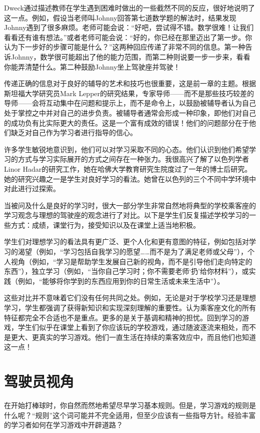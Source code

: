 Dweck通过描述教师在学生遇到困难时做出的一些截然不同的反应，很好地说明了这一点。例如，假设当老师叫Johnny回答第七道数学题的解法时，结果发现Johnny遇到了很多麻烦。老师可能会说：“好吧，尝试得不错。数学很难！让我们看看还有谁有想法。”或者老师可能会说：“好的，你已经在那里迈出了第一步。你认为下一步好的步骤可能是什么？”这两种回应传递了非常不同的信息。第一种告诉Johnny，数学很可能超出了他的能力范围，而第二种则说要一步一步来，看看你能弄清楚什么。第二种鼓励Johnny坐上驾驶座并驾驶！

传递正确的信息对于良好的辅导的艺术和技巧也很重要，这是前一章的主题。根据斯坦福大学研究员Mark Lepper的研究结果，专家导师——而不是那些技巧较差的导师——会将互动集中在问题和提示上，而不是命令上，以鼓励被辅导者认为自己处于掌控之中并对自己的进步负责。被辅导者通常会形成一种印象，即他们对自己的成功负有比实际更大的责任。这是一个富有成效的错误！他们的问题部分在于他们缺乏对自己作为学习者进行指导的信心。

许多学生敏锐地意识到，他们可以对学习采取不同的心态。他们认识到他们希望学习的方式与学习实际展开的方式之间存在一种张力。我很高兴了解了以色列学者Linor Hadar的研究工作，她在哈佛大学教育研究生院度过了一年的博士后研究。她的研究兴趣之一是学生对良好学习的看法。她曾在以色列的三个不同中学环境中对此进行过探索。

当被问及什么是良好的学习时，很大一部分学生非常自然地将典型的学校乘客座的学习观念与理想的驾驶座的观念进行了对比。以下是学生们反复描述学校学习的一些方式：成绩，课堂行为，接受知识以及在课堂上适当地积极。

学生们对理想学习的看法具有更广泛、更个人化和更有意图的特征，例如包括对学习的渴望（例如，“学习包括自我学习的愿望……而不是为了满足老师或父母”），个人视角（例如，“学习是帮助学生发展自己新的视角，而不是引导他们走向特定的东西”），独立学习（例如，“当你自己学习时；你不需要老师‘扔’给你材料”），或实践（例如，“能够将你学到的东西应用到你的日常生活或未来生活中”）。

这些对比并不意味着它们没有任何共同之处。例如，无论是对于学校学习还是理想学习，学生都强调了获得新知识和实现深刻理解的重要性。认为乘客座文化的所有特征都完全不合适也不是重点。更多的是关于基调和精神的担忧。回到学习的游戏，学生们似乎在课堂上看到了你应该玩的学校游戏，通过随波逐流来相处，而不是更大、更真实的学习游戏。他们一直生活在持续的乘客效应中，而且他们也知道这一点！

\section*{驾驶员视角}

在开始打棒球时，你自然而然地希望尽早学习基本规则。但是，学习游戏的规则是什么呢？“规则”这个词可能并不完全适用，但至少应该有一些指导方针。经验丰富的学习者如何在学习游戏中开辟道路？

